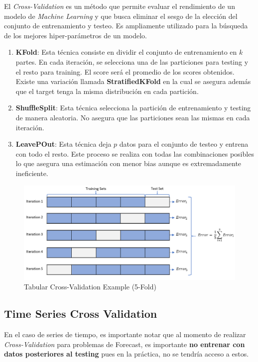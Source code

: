 El \textit{Cross-Validation} es un método que permite evaluar el rendimiento de un modelo de \textit{Machine Learning} y que busca eliminar el sesgo de la elección del conjunto de entrenamiento y testeo. Es ampliamente utilizado para la búsqueda de los mejores hiper-parámetros de un modelo. 

\begin{enumerate}
    \item \textbf{KFold}: Esta técnica consiste en dividir el conjunto de entrenamiento en $k$ partes. En cada iteración, se selecciona una de las particiones para testing y el resto para training. El score será el promedio de los scores obtenidos. Existe una variación llamada \textbf{StratifiedKFold} en la cual se asegura además que el target tenga la misma distribución en cada partición.
    \item \textbf{ShuffleSplit}: Esta técnica selecciona la partición de entrenamiento y testing de manera aleatoria. No asegura que las particiones sean las mismas en cada iteración. 
    \item \textbf{LeavePOut}: Esta técnica deja $p$ datos para el conjunto de testeo y entrena con todo el resto. Este proceso se realiza con todas las combinaciones posibles lo que asegura una estimación con menor bias aunque es extremadamente ineficiente. 
\end{enumerate}

\begin{figure}[H]
    \center
    \includegraphics[scale=0.3]{notebooks/Others/img/tabular_cross_validation.png}
    \caption{Tabular Cross-Validation Example (5-Fold)}
\end{figure}

\subsection{Time Series Cross Validation}

En el caso de series de tiempo, es importante notar que al momento de realizar \textit{Cross-Validation} para problemas de Forecast, es importante \textbf{no entrenar con datos posteriores al testing} pues en la práctica, no se tendría acceso a estos.

